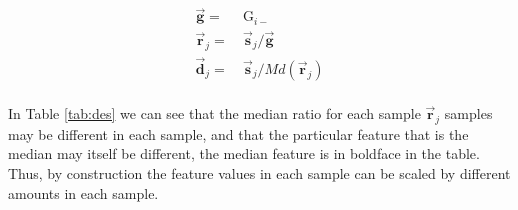 \documentclass[twocolumn]{article}
\begin{document}
\begin{equation}
    \begin{aligned}
        \vec{\textbf{g}} = &\ \mathrm{G}_{i-}\\
        \vec{\textbf{r}}_j = &\ \vec{\textbf{s}}_j / \vec{\textbf{g}}\\
        \vec{\textbf{d}}_j = &\ \vec{\textbf{s}}_j / Md(\vec{\textbf{r}}_j)\\
    \end{aligned}
\label{eq:dm}
\end{equation}

In Table \ref{tab:des} we can see that the median ratio for each sample
\(\vec{\textbf{r}}_j\) samples may be different in each sample, and that
the particular feature that is the median may itself be different, the
median feature is in boldface in the table. Thus, by construction the
feature values in each sample can be scaled by different amounts in each
sample.

\begin{table}[!h]
\caption{Example calculation of DM normalization}
\centering
{}
\label{tab:des}
\end{table}
\end{document}
